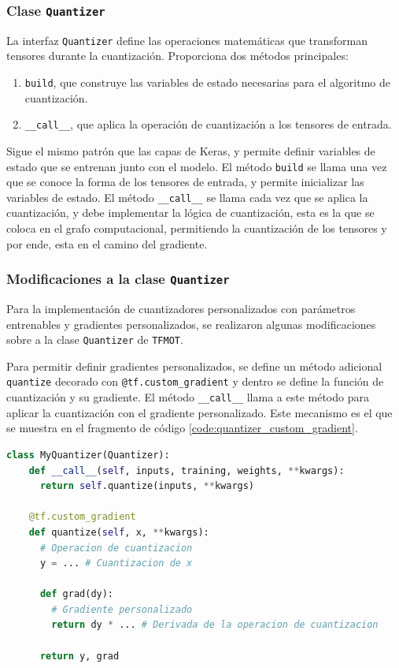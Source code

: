 \subsubsection{Clase \texttt{Quantizer}}

La interfaz \texttt{Quantizer} define las operaciones matemáticas que transforman tensores durante la cuantización. Proporciona dos métodos principales:

\begin{enumerate}
    \item \texttt{build}, que construye las variables de estado necesarias para el algoritmo de cuantización.
    \item \texttt{\_\_call\_\_}, que aplica la operación de cuantización a los tensores de entrada.
\end{enumerate}

Sigue el mismo patrón que las capas de Keras, y permite definir variables de estado que se entrenan junto con el modelo. El método \texttt{build} se llama una vez que se conoce la forma de los tensores de entrada, y permite inicializar las variables de estado. El método \texttt{\_\_call\_\_} se llama cada vez que se aplica la cuantización, y debe implementar la lógica de cuantización, esta es la que se coloca en el grafo computacional, permitiendo la cuantización de los tensores y por ende, esta en el camino del gradiente.

\subsubsection{Modificaciones a la clase \texttt{Quantizer}}
Para la implementación de cuantizadores personalizados con parámetros entrenables y gradientes personalizados, se realizaron algunas modificaciones sobre a la clase \texttt{Quantizer} de \texttt{TFMOT}.

Para permitir definir gradientes personalizados, se define un método adicional \texttt{quantize} decorado con \texttt{@tf.custom\_gradient} y dentro se define la función de cuantización y su gradiente. El método \texttt{\_\_call\_\_} llama a este método para aplicar la cuantización con el gradiente personalizado. Este mecanismo es el que se muestra en el fragmento de código \ref{code:quantizer_custom_gradient}.

\begin{lstlisting}[language=Python,label=code:quantizer_custom_gradient,caption=Definición de un cuantizador con gradiente personalizado.]
  class MyQuantizer(Quantizer):
    def __call__(self, inputs, training, weights, **kwargs):
      return self.quantize(inputs, **kwargs)

    @tf.custom_gradient
    def quantize(self, x, **kwargs):
      # Operacion de cuantizacion
      y = ... # Cuantizacion de x

      def grad(dy):
        # Gradiente personalizado
        return dy * ... # Derivada de la operacion de cuantizacion

      return y, grad
\end{lstlisting}

